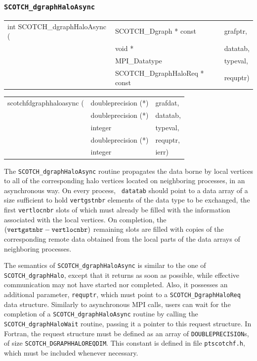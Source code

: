 \subsubsection{{\tt SCOTCH\_dgraphHaloAsync}}
\label{sec-lib-func-dgraphhaloasync}

\begin{itemize}
\progsyn

{\tt\begin{tabular}{l@{}ll}

int SCOTCH\_dgraphHaloAsync ( & SCOTCH\_Dgraph * const        & grafptr, \\
                              & void *                        & datatab, \\
                              & MPI\_Datatype                 & typeval, \\
                              & SCOTCH\_DgraphHaloReq * const & requptr)
\end{tabular}}

{\tt\begin{tabular}{l@{}ll}
scotchfdgraphhaloasync ( & doubleprecision (*) & grafdat, \\
                         & doubleprecision (*) & datatab, \\
                         & integer             & typeval, \\
                         & doubleprecision (*) & requptr, \\
                         & integer             & ierr)
\end{tabular}}

\progdes

The {\tt SCOTCH\_dgraphHaloAsync} routine propagates the data borne by
local vertices to all of the corresponding halo vertices located on
neighboring processes, in an asynchronous way. On every process, {\tt
datatab} should point to a data array of a size sufficient to hold
{\tt vert\lbt gst\lbt nbr} elements of the data type to be exchanged,
the first {\tt vertlocnbr} slots of which must already be filled with
the information associated with the local vertices. On completion, the
$({\tt vert\lbt gst\lbt nbr} - {\tt vert\lbt loc\lbt nbr})$ remaining
slots are filled with copies of the corresponding remote data obtained
from the local parts of the data arrays of neighboring processes.

The semantics of {\tt SCOTCH\_dgraphHaloAsync} is similar to the one
of {\tt SCOTCH\_dgraph\lbt Halo}, except that it returns as soon as
possible, while effective communication may not have started nor
completed. Also, it possesses an additional parameter, {\tt requptr},
which must point to a {\tt SCOTCH\_\lbt Dgraph\lbt Halo\lbt Req} data
structure. Similarly to asynchronous MPI calls, users can wait for the
completion of a {\tt SCOTCH\_dgraph\lbt Halo\lbt Async} routine by
calling the {\tt SCOTCH\_dgraph\lbt Halo\lbt Wait} routine, passing it
a pointer to this request structure. In Fortran, the request structure
must be defined as an array of {\tt DOUBLEPRECISION}s, of size
{\tt SCOTCH\_\lbt DGRAPH\lbt HALO\lbt REQDIM}. This constant is
defined in file {\tt ptscotchf.h}, which must be included whenever
necessary.


\end{itemize}
